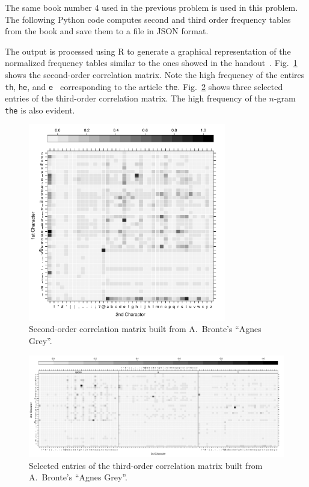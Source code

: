 \documentclass[conference]{IEEEtran}
\newcommand{\codeinline}[1]{{\fontsize{8}{0}\selectfont\texttt{#1}}}
\newcommand{\codefile}[1]{
  \begin{framed}
  \fontsize{5.65}{6.78}\selectfont
  
  \end{framed}
}
\begin{document}
The same book number 4 used in the previous problem is used in this problem.
The following Python code computes second and third order frequency tables from the book and save them to a file in JSON format.

\codefile{problem1e.py}

The output is processed using R to generate a graphical representation of the normalized frequency tables similar to the ones showed in the handout~\cite{Bennett1976}.
Fig.~\ref{fig:agnes_grey_2nd_order} shows the second-order correlation matrix. 
Note the high frequency of the entires \codeinline{th}, \codeinline{he}, and \codeinline{e } corresponding to the article \codeinline{the}.
Fig.~\ref{fig:agnes_grey_3rd_order} shows three selected entries of the third-order correlation matrix.
The high frequency of the $n$-gram \codeinline{the} is also evident.

\begin{figure}[htb]
\centering
\includegraphics[width=3.4in]{agnes_grey_2nd_order}
\caption{Second-order correlation matrix built from A.~Bronte's ``Agnes Grey''.}
\label{fig:agnes_grey_2nd_order}
\end{figure}

\begin{figure}[!t]
\centering
\includegraphics[width=\textwidth]{agnes_grey_3rd_order}
\caption{Selected entries of the third-order correlation matrix built from 
A.~Bronte's ``Agnes Grey''.}
\label{fig:agnes_grey_3rd_order}
\end{figure}
\end{document}
